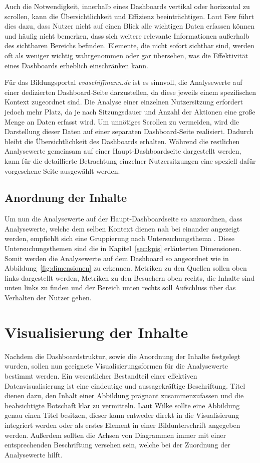 Auch die Notwendigkeit, innerhalb eines Dashboards vertikal oder horizontal zu scrollen, kann die Übersichtlichkeit und Effizienz beeinträchtigen. Laut Few führt dies dazu, dass Nutzer nicht auf einen Blick alle wichtigen Daten erfassen können und häufig nicht bemerken, dass sich weitere relevante Informationen außerhalb des sichtbaren Bereichs befinden. Elemente, die nicht sofort sichtbar sind, werden oft als weniger wichtig wahrgenommen oder gar übersehen, was die Effektivität eines Dashboards erheblich einschränken kann. \parencite[Kap.3.1.1]{Few2006}

Für das Bildungsportal \textit{evaschiffmann.de} ist es sinnvoll, die Analysewerte auf einer dedizierten Dashboard-Seite darzustellen, da diese jeweils einem spezifischen Kontext zugeordnet sind. Die Analyse einer einzelnen Nutzersitzung erfordert jedoch mehr Platz, da je nach Sitzungsdauer und Anzahl der Aktionen eine große Menge an Daten erfasst wird. Um unnötiges Scrollen zu vermeiden, wird die Darstellung dieser Daten auf einer separaten Dashboard-Seite realisiert. Dadurch bleibt die Übersichtlichkeit des Dashboards erhalten. Während die restlichen Analysewerte gemeinsam auf einer Haupt-Dashboardseite dargestellt werden, kann für die detaillierte Betrachtung einzelner Nutzersitzungen eine speziell dafür vorgesehene Seite ausgewählt werden.

\subsection{Anordnung der Inhalte}
Um nun die Analysewerte auf der Haupt-Dashboardseite so anzuordnen, dass Analysewerte, welche dem selben Kontext dienen nah bei einander angezeigt werden, empfiehlt sich eine Gruppierung nach Untersuchungsthema \parencite[Kap.14.3.1]{Hassler2019}. Diese Untersuchungsthemen sind die in Kapitel~\ref{sec:kpis} erläuterten Dimensionen. Somit werden die Analysewerte auf dem Dashboard so angeordnet wie in Abbildung~\ref{fig:dimensionen} zu erkennen. Metriken zu den Quellen sollen oben links dargestellt werden, Metriken zu den Besuchern oben rechts, die Inhalte sind unten links zu finden und der Bereich unten rechts soll Aufschluss über das Verhalten der Nutzer geben.

\section{Visualisierung der Inhalte}
\label{sec:Visualisierungsmethoden}
Nachdem die Dashboardstruktur, sowie die Anordnung der Inhalte festgelegt wurden, sollen nun geeignete Visualisierungsformen für die Analysewerte bestimmt werden. 
Ein wesentlicher Bestandteil einer effektiven Datenvisualisierung ist eine eindeutige und aussagekräftige Beschriftung. Titel dienen dazu, den Inhalt einer Abbildung prägnant zusammenzufassen und die beabsichtigte Botschaft klar zu vermitteln. Laut Wilke sollte eine Abbildung genau einen Titel besitzen, dieser kann entweder direkt in die Visualisierung integriert werden oder als erstes Element in einer Bildunterschrift angegeben werden. Außerdem sollten die Achsen von Diagrammen immer mit einer entsprechenden Beschriftung versehen sein, welche bei der Zuordnung der Analysewerte hilft. \parencite[Kap.22]{Wilke}

